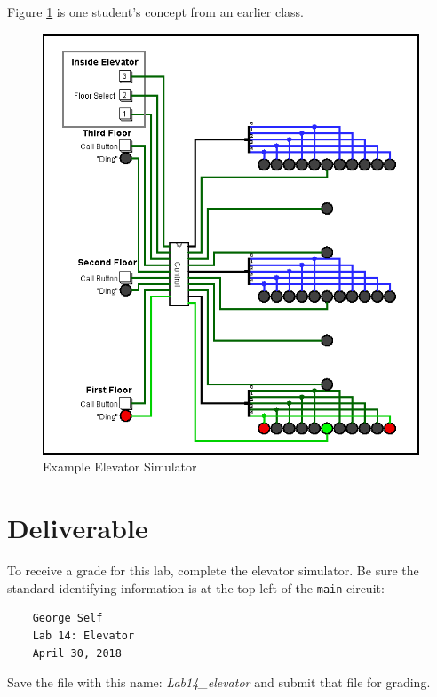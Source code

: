 Figure \ref{fig:elev-01} is one student's concept from an earlier class. 

\begin{figure}[H]
	\centering
	\includegraphics[width=\maxwidth{.95\linewidth}]{gfx/elev-01}
	\caption{Example Elevator Simulator}
	\label{fig:elev-01}
\end{figure}

\section{Deliverable}

To receive a grade for this lab, complete the elevator simulator. Be sure the standard identifying information is at the top left of the \lstinline{main} circuit: 

\bigskip
\begin{minipage}{\linewidth}
	\begin{verbatim}
	George Self
	Lab 14: Elevator
	April 30, 2018
	\end{verbatim}
\end{minipage}
\bigskip

Save the file with this name: \textit{Lab14\_elevator} and submit that file for grading.